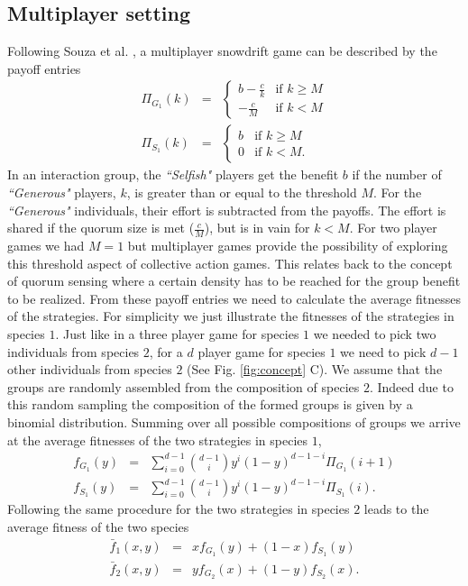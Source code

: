 \documentclass[aps,pre,amsfonts,floatfix, onecolumn,showkeys]{revtex4-1}
\begin{document}
\subsection{Multiplayer setting}
\label{appB}

Following Souza et al. \cite{souza:JTB:2009},  
a multiplayer snowdrift game can be described by the payoff entries
\begin{eqnarray}
\Pi_{G_1} (k) &=& \begin{cases} b-\frac{c}{k} & \textrm{if } k \geq M \\  -\frac{c}{M} & \textrm{if } k < M \end{cases}
\\
\Pi_{S_1} (k) &=& \begin{cases} b & \textrm{if } k \geq M \\ 0 & \textrm{if } k < M. \end{cases}
\end{eqnarray}
%
In an interaction group, the \textit{``Selfish"} players get the benefit $b$ if the number of \textit{``Generous"} players, $k$, is greater than or equal to the threshold $M$.
For the \textit{``Generous"} individuals, their effort is subtracted from the payoffs.
The effort is shared if the quorum size is met ($\frac{c}{M}$), but is in vain for $k<M$.
For two player games we had $M=1$ but multiplayer games provide the possibility of exploring this threshold aspect of collective action games.
This relates back to the concept of quorum sensing \cite{sandoz:PNAS:2007,dyken:AmNat:2012} where a certain density has to be reached for the group benefit to be realized.
From these payoff entries we need to calculate the average fitnesses of the strategies.
For simplicity we just illustrate the fitnesses of the strategies in species $1$.
Just like in a three player game for species $1$ we needed to pick two individuals from species $2$, for a $d$ player game for species $1$ we need to pick $d-1$ other individuals from species $2$ (See Fig. \ref{fig:concept} C).
We assume that the groups are randomly assembled from the composition of species $2$.
Indeed due to this random sampling the composition of the formed groups is given by a binomial distribution.
Summing over all possible compositions of groups we arrive at  the average fitnesses of the two strategies in species $1$,
%
\begin{eqnarray}
f_{G_1} (y) &=& \sum_{i=0}^{d-1} \binom{d-1}{i}y^i (1-y)^{d-1-i} \Pi_{G_1}(i+1) \nonumber \\
f_{S_1} (y) &=& \sum_{i=0}^{d-1} \binom{d-1}{i}y^i (1-y)^{d-1-i} \Pi_{S_1}(i).
\label{fiteqs}
\end{eqnarray}
%
Following the same procedure for the two strategies in species $2$ leads to the average fitness of the two species
%
\begin{eqnarray}
\bar{f}_1 (x,y) &=& x f_{G_1} (y)+(1-x) f_ {S_1}(y)\nonumber \\
\bar{f}_2 (x,y) &=& y f_{G_2} (x)+(1-y) f_{S_2}(x).
\label{avgfiteqs}
\end{eqnarray}
%
\end{document}
